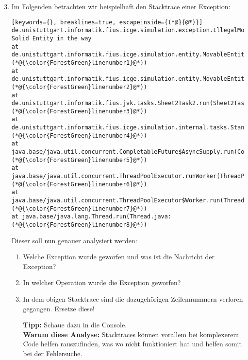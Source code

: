 \begin{enumerate}[label=\alph*)] \setcounter{enumi}{2}
    \item Im Folgenden betrachten wir beispielhaft den Stacktrace einer Exception:
        \begin{lstlisting}[keywords={}, breaklines=true, escapeinside={(*@}{@*)}]
de.unistuttgart.informatik.fius.icge.simulation.exception.IllegalMoveException: Solid Entity in the way
at de.unistuttgart.informatik.fius.icge.simulation.entity.MovableEntity.internalMove(MovableEntity.java:(*@{\color{ForestGreen}linenumber1}@*))
at de.unistuttgart.informatik.fius.icge.simulation.entity.MovableEntity.move(MovableEntity.java:(*@{\color{ForestGreen}linenumber2}@*))
at de.unistuttgart.informatik.fius.jvk.tasks.Sheet2Task2.run(Sheet2Task2.java:(*@{\color{ForestGreen}linenumber3}@*))
at de.unistuttgart.informatik.fius.icge.simulation.internal.tasks.StandardTaskRunner.executeTask(StandardTaskRunner.java:(*@{\color{ForestGreen}linenumber4}@*))
at java.base/java.util.concurrent.CompletableFuture$AsyncSupply.run(CompletableFuture.java:(*@{\color{ForestGreen}linenumber5}@*))
at java.base/java.util.concurrent.ThreadPoolExecutor.runWorker(ThreadPoolExecutor.java:(*@{\color{ForestGreen}linenumber6}@*))
at java.base/java.util.concurrent.ThreadPoolExecutor$Worker.run(ThreadPoolExecutor.java:(*@{\color{ForestGreen}linenumber7}@*))
at java.base/java.lang.Thread.run(Thread.java:(*@{\color{ForestGreen}linenumber8}@*))
        \end{lstlisting}

        Dieser soll nun genauer analysiert werden:

        \begin{enumerate}
            \item[i)] Welche Exception wurde geworfen und was ist die Nachricht der Exception?
            \item[ii)] In welcher Operation wurde die Exception geworfen?
            \item[iii)] In dem obigen Stacktrace sind die dazugehörigen Zeilennummern verloren gegangen. Ersetze diese!

            \textbf{Tipp:} Schaue dazu in die Console.\\
            \textbf{Warum diese Analyse:} Stacktraces können vorallem bei komplexerem Code helfen rauszufinden, was wo nicht funktioniert hat und helfen somit bei der Fehlersuche.
        \end{enumerate}


\end{enumerate}
